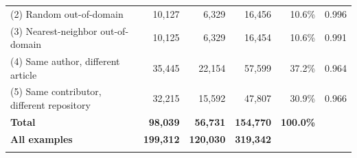 \documentclass[pdflatex,sn-nature]{sn-jnl}%
\begin{document}
\begin{table}[p]
\begin{tabular}{@{}lrrrrr@{}}
\quad (2) Random out-of-domain & 10,127 & 6,329 & 16,456 & 10.6\% & 0.996 \\
\quad (3) Nearest-neighbor out-of-domain & 10,125 & 6,329 & 16,454 & 10.6\% & 0.991 \\
\quad (4) Same author, different article & 35,445 & 22,154 & 57,599 & 37.2\% & 0.964 \\
\quad (5) Same contributor, different repository & 32,215 & 15,592 & 47,807 & 30.9\% & 0.966 \\
\quad \textbf{Total} & \textbf{98,039} & \textbf{56,731} & \textbf{154,770} & \textbf{100.0\%} & \\
\midrule
\textbf{All examples} & \textbf{199,312} & \textbf{120,030} & \textbf{319,342} & & \\
\botrule
\end{tabular}
\end{table}
\end{document}
